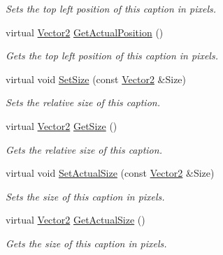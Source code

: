 \begin{DoxyCompactItemize}
\begin{DoxyCompactList}\small\item\em Sets the top left position of this caption in pixels. \item\end{DoxyCompactList}\item 
virtual \hyperlink{classphys_1_1Vector2}{Vector2} \hyperlink{classphys_1_1UI_1_1Caption_aae3e6728a26111e12b081992d6d04e1a}{GetActualPosition} ()
\begin{DoxyCompactList}\small\item\em Gets the top left position of this caption in pixels. \item\end{DoxyCompactList}\item 
virtual void \hyperlink{classphys_1_1UI_1_1Caption_a4354cc59deb62b1e2b52a07f775c085e}{SetSize} (const \hyperlink{classphys_1_1Vector2}{Vector2} \&Size)
\begin{DoxyCompactList}\small\item\em Sets the relative size of this caption. \item\end{DoxyCompactList}\item 
virtual \hyperlink{classphys_1_1Vector2}{Vector2} \hyperlink{classphys_1_1UI_1_1Caption_a1da2e0e9ce0d904595f53a10244fcaf4}{GetSize} ()
\begin{DoxyCompactList}\small\item\em Gets the relative size of this caption. \item\end{DoxyCompactList}\item 
virtual void \hyperlink{classphys_1_1UI_1_1Caption_adf86621e59a91112d011f0d1a1afe492}{SetActualSize} (const \hyperlink{classphys_1_1Vector2}{Vector2} \&Size)
\begin{DoxyCompactList}\small\item\em Sets the size of this caption in pixels. \item\end{DoxyCompactList}\item 
virtual \hyperlink{classphys_1_1Vector2}{Vector2} \hyperlink{classphys_1_1UI_1_1Caption_aa80a4328d76458a6e869c485bea48b98}{GetActualSize} ()
\begin{DoxyCompactList}\small\item\em Gets the size of this caption in pixels. \item\end{DoxyCompactList}\item 

\end{DoxyCompactItemize}
